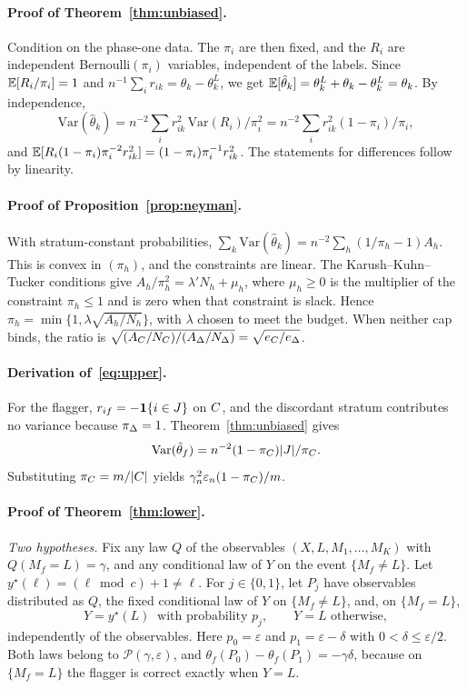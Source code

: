 \paragraph{Proof of Theorem~\ref{thm:unbiased}.} Condition on the phase-one data. The $\pi_i$ are then fixed, and the $R_i$ are independent Bernoulli$(\pi_i)$ variables, independent of the labels. Since $\mathbb{E}[R_i/\pi_i]=1$ and $n^{-1}\sum_i r_{ik}=\theta_k-\theta^L_k$, we get $\mathbb{E}[\hat\theta_k]=\theta^L_k+\theta_k-\theta^L_k=\theta_k$. By independence,
\[
\mathrm{Var}(\hat\theta_k)=n^{-2}\sum_i r_{ik}^2\,\mathrm{Var}(R_i)/\pi_i^2=n^{-2}\sum_i r_{ik}^2(1-\pi_i)/\pi_i ,
\]
and $\mathbb{E}[R_i(1-\pi_i)\pi_i^{-2}r_{ik}^2]=(1-\pi_i)\pi_i^{-1}r_{ik}^2$. The statements for differences follow by linearity. \hfill\BlackBox

\paragraph{Proof of Proposition~\ref{prop:neyman}.} With stratum-constant probabilities, $\sum_k\mathrm{Var}(\hat\theta_k)=n^{-2}\sum_h(1/\pi_h-1)A_h$. This is convex in $(\pi_h)$, and the constraints are linear. The Karush--Kuhn--Tucker conditions give $A_h/\pi_h^2=\lambda' N_h+\mu_h$, where $\mu_h\ge0$ is the multiplier of the constraint $\pi_h\le1$ and is zero when that constraint is slack. Hence $\pi_h=\min\{1,\lambda\sqrt{A_h/N_h}\}$, with $\lambda$ chosen to meet the budget. When neither cap binds, the ratio is $\sqrt{(A_C/N_C)/(A_\Delta/N_\Delta)}=\sqrt{e_C/e_\Delta}$. \hfill\BlackBox

\paragraph{Derivation of~\eqref{eq:upper}.} For the flagger, $r_{if}=-\mathbf{1}\{i\in J\}$ on $C$, and the discordant stratum contributes no variance because $\pi_\Delta=1$. Theorem~\ref{thm:unbiased} gives
\[
\mathrm{Var}(\hat\theta_f)=n^{-2}(1-\pi_C)|J|/\pi_C .
\]
Substituting $\pi_C=m/|C|$ yields $\gamma_n^2\varepsilon_n(1-\pi_C)/m$.

\paragraph{Proof of Theorem~\ref{thm:lower}.} \emph{Two hypotheses.} Fix any law $Q$ of the observables $(X,L,M_1,\dots,M_K)$ with $Q(M_f=L)=\gamma$, and any conditional law of $Y$ on the event $\{M_f\ne L\}$. Let $y^\star(\ell)=(\ell\bmod c)+1\ne\ell$. For $j\in\{0,1\}$, let $P_j$ have observables distributed as $Q$, the fixed conditional law of $Y$ on $\{M_f\neq L\}$, and, on $\{M_f=L\}$,
\[
Y=y^\star(L)\ \text{ with probability } p_j,\qquad Y=L \text{ otherwise},
\]
independently of the observables. Here $p_0=\varepsilon$ and $p_1=\varepsilon-\delta$ with $0<\delta\le\varepsilon/2$. Both laws belong to $\mathcal P(\gamma,\varepsilon)$, and $\theta_f(P_0)-\theta_f(P_1)=-\gamma\delta$, because on $\{M_f=L\}$ the flagger is correct exactly when $Y=L$.

